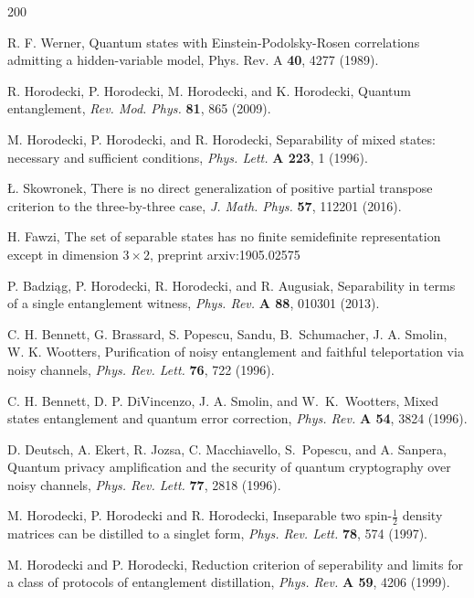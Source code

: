 \documentclass[english,aps,pra,nofootinbib,twocolumn,superscriptaddress]{revtex4-1}
\newcommand{\1}{{\rm 1\hspace{-0.9mm}l}}
\begin{document}
\begin{thebibliography}{200}


R. F. Werner, Quantum states with Einstein-Podolsky-Rosen correlations admitting a hidden-variable model,
Phys. Rev. A {\bf 40}, 4277 (1989).
 
 R. Horodecki, P. Horodecki, M. Horodecki, and K. Horodecki,
 Quantum entanglement,
 {\sl  Rev. Mod. Phys.} {\bf 81}, 865 (2009).

    M. Horodecki, P. Horodecki, and R. Horodecki,
   Separability of mixed states: necessary and sufficient conditions, 
   {\sl Phys. Lett.} {\bf A 223}, 1 (1996).

 {\L}. Skowronek,
 There is no direct generalization of positive partial
  transpose criterion to the three-by-three case,
 {\sl  J. Math. Phys.} {\bf  57}, 112201 (2016). 

 H. Fawzi,
The set of separable states has no finite semidefinite representation except in dimension 
$3 \times 2$, 
preprint  arxiv:1905.02575

 P. Badzi{\k a}g, P. Horodecki, R. Horodecki, and R. Augusiak,
Separability in terms of a single entanglement witness, 
{\sl Phys. Rev.} {\bf  A 88}, 010301 (2013).

C. H. Bennett, G. Brassard, S.  Popescu, Sandu, B.~Schumacher, J. A. Smolin,  W. K. Wootters,   Purification of noisy entanglement and faithful teleportation via noisy channels,
{\sl Phys. Rev. Lett.} {\bf 76}, 722 (1996).

 C. H. Bennett, D. P. DiVincenzo, J. A. Smolin, and
 W.~K.~Wootters, Mixed states entanglement and quantum error correction,
{\sl Phys. Rev.} {\bf A 54}, 3824 (1996).

 D. Deutsch, A. Ekert, R. Jozsa, C. Macchiavello, S.~Popescu, and A. Sanpera,
 Quantum privacy amplification and the security of quantum cryptography over noisy channels,
{\sl  Phys. Rev. Lett.} {\bf 77}, 2818 (1996).


  M. Horodecki, P. Horodecki and R. Horodecki, 
 Inseparable two spin-$\frac{1}{2}$ 
	density matrices can be distilled to a singlet form, 
	{\sl Phys. Rev. Lett.} {\bf  78}, 574 (1997).

 M. Horodecki and P. Horodecki, 
Reduction criterion of seperability and limits for a class of protocols of entanglement distillation, 
{\sl Phys. Rev.} {\bf A 59}, 4206 (1999).


\end{thebibliography}
\end{document}
